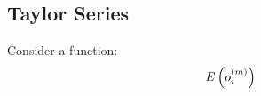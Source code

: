 \subsection{Taylor Series}
Consider a function:
\begin{align}
E\left({o_{i}^{(m)}}\right)
\end{align}


